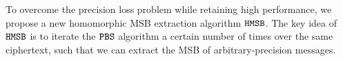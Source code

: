 To overcome the precision loss problem while retaining high performance,
we propose a new homomorphic MSB extraction algorithm $\texttt{HMSB}$.
The key idea of $\texttt{HMSB}$ is to iterate the $\texttt{PBS}$ algorithm
a certain number of times over the same ciphertext, such that we can
extract the MSB of arbitrary-precision messages. 





